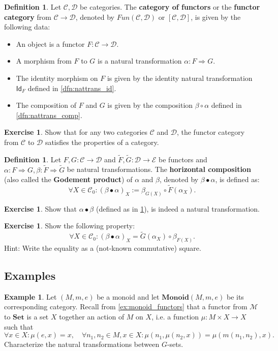 \documentclass[a4paper,10pt]{scrartcl}
\theoremstyle{plain}
\theoremstyle{definition}
\newtheorem{dfn}[thm]{Definition}
\newtheorem{exa}[thm]{Example}
\newtheorem{exer}[thm]{Exercise}
\newcommand{\cfont}[1]{\ensuremath{\mathsf{#1}}}
\newcommand{\Cat}[1]{\mathcal{#1}}
\newcommand{\CC}{\Cat{C}}
\newcommand{\DD}{\Cat{D}}
\newcommand{\EE}{\Cat{E}}
\newcommand{\Catb}[1]{\mathbf{#1}}
\newcommand{\SET}{\Catb{Set}}
\newcommand{\MON}{\Catb{Monoid}}
\newcommand{\Ob}[1]{{#1}_0}
\newcommand{\Id}[1][]{\cfont{Id}_{#1}}
\newcommand{\NatTrans}[3]{#1 : #2 \Rightarrow #3}
\newcommand{\co}[2]{\ensuremath{#2 \circ #1}}
\begin{document}
\begin{dfn} Let $\CC,\DD$ be categories. The \textbf{category of functors} or the \textbf{functor category} from $\CC\to\DD$, denoted by $Fun(\CC,\DD)$ or $[\CC,\DD]$, is given by the following data:
\begin{itemize}
\item An object is a functor $F:\CC\to\DD$.
\item A morphism from $F$ to $G$ is a natural transformation $\NatTrans{\alpha}{F}{G}$.
\item The identity morphism on $F$ is given by the identity natural transformation $\Id[F]$ defined in \cref{dfn:nattrans_id}.
\item The composition of $F$ and $G$ is given by the composition $\co{\alpha}{\beta}$ defined in \cref{dfn:nattrans_comp}.
\end{itemize}
\end{dfn}

\begin{exer} Show that for any two categories $\CC$ and $\DD$, the functor category from $\CC$ to $\DD$ satisfies the properties of a category.
\end{exer}

\begin{dfn}\label{dfn:nattrans_horcomp} Let $F,G : \CC\to\DD$ and $\tilde{F},\tilde{G}:\DD\to\EE$ be functors and $\NatTrans{\alpha}{F}{G}, \NatTrans{\beta}{\tilde{F}}{\tilde{G}}$ be natural transformations. The \textbf{horizontal composition} (also called the \textbf{Godement product}) of $\alpha$ and $\beta$, denoted by $\beta \bullet \alpha$, is defined as:
\begin{equation}\label{eqn:nattrans_horcomp}
\forall X\in \Ob{\CC}: (\beta\bullet\alpha)_X := \co{\tilde{F}(\alpha_X)}{\beta_{G(X)}}.
\end{equation}
\end{dfn}

\begin{exer} Show that $\alpha\bullet\beta$ (defined as in \cref{dfn:nattrans_horcomp}), is indeed a natural transformation.
\end{exer}

\begin{exer} Show the following property: 
\[
\forall X\in \Ob{\CC}: (\beta\bullet\alpha)_X = \co{\beta_{F(X)}}{\tilde{G}(\alpha_X)}.
\]
Hint: Write the equality as a (not-known commutative) square.
\end{exer}

\subsection{Examples}
\begin{exa} Let $(M,m,e)$ be a monoid and let $\MON(M,m,e)$ be its corresponding category. Recall from \cref{ex:monoid_functors} that a functor from $\mathcal{M}$ to $\SET$ is a set $X$ together an action of $M$ on $X$, i.e. a function $\mu: M\times X\to X$ such that 
\[
\forall x\in X: \mu(e,x) = x, \quad \forall n_1,n_2\in M, x\in X: \mu(n_1, \mu(n_2,x)) = \mu(m(n_1,n_2), x).
\]
Characterize the natural transformations between $G$-sets.
\end{exa}
\end{document}
